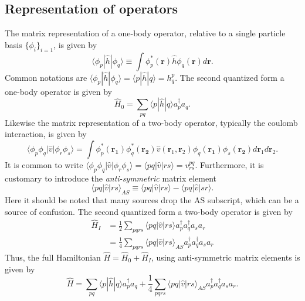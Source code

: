 \documentclass[a4paper,10pt]{report}
\newcommand{\braket}[1]{\langle#1\rangle}
\theoremstyle{definition}
\begin{document}
\subsection*{Representation of operators}
The matrix representation of a one-body operator, relative to a single particle basis $\{ \phi_i \}_{i=1}$, is given by 
\begin{equation}
 \braket{\phi_p|\hat{h}|\phi_q} \equiv \int \phi^*_p(\mathbf{r}) \hat{h} \phi_q(\mathbf{r}) d\mathbf{r}.
\end{equation}
Common notations are $\braket{\phi_p|\hat{h}|\phi_q}=\braket{p|\hat{h}|q}=h^p_q$. The second quantized form a one-body operator 
is given by
\begin{equation}
 \hat{H}_0 = \sum_{pq}\braket{p|\hat{h}|q} a_p^\dagger a_q.
\end{equation}
Likewise the matrix representation of a two-body operator, typically the coulomb interaction, is given by 
\begin{equation}
 \braket{\phi_p \phi_q|\hat{v}|\phi_r \phi_s} = \int \phi^*_p(\mathbf{r_1}) \phi^*_q(\mathbf{r_2}) \hat{v}(\mathbf{r}_1,\mathbf{r}_2) \phi_q(\mathbf{r_1}) \phi_s(\mathbf{r_2}) d \mathbf{r}_1 d \mathbf{r}_2.
\end{equation}
It is common to write $\braket{\phi_p \phi_q|\hat{v}|\phi_r \phi_s} = \braket{pq|\hat{v}|rs} = v^{pq}_{rs}$. Furthermore, it is customary 
to introduce the \textit{anti-symmetric} matrix element
\begin{equation}
 \braket{pq|\hat{v}|rs}_{AS} \equiv \braket{pq|\hat{v}|rs} - \braket{pq|\hat{v}|sr}.
\end{equation}
Here it should be noted that many sources drop the AS subscript, which can be a source of confusion. The second quantized form a 
two-body operator is given by
\begin{align}
 \hat{H}_I &= \frac{1}{2} \sum_{pqrs} \braket{pq|\hat{v}|rs} a_p^\dagger a_q^\dagger a_s a_r \\
 &= \frac{1}{4}\sum_{pqrs} \braket{pq|\hat{v}|rs}_{AS} a_p^\dagger a_q^\dagger a_s a_r 
\end{align}
Thus, the full Hamiltonian $\hat{H} = \hat{H}_0 + \hat{H}_I$, using anti-symmetric matrix elements is given by 
\begin{equation}
 \hat{H} =  \sum_{pq}\braket{p|\hat{h}|q} a_p^\dagger a_q + \frac{1}{4}\sum_{pqrs} \braket{pq|\hat{v}|rs}_{AS} a_p^\dagger a_q^\dagger a_s a_r.
\end{equation}
\end{document}
